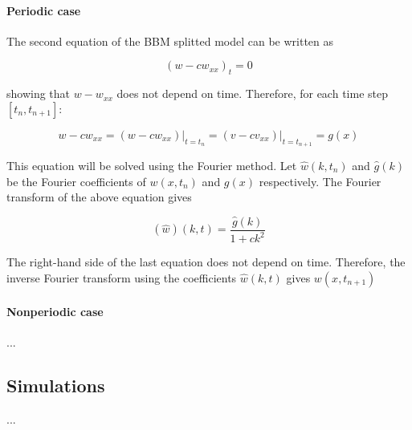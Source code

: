 \paragraph{Periodic case}

\indent The second equation of the BBM splitted model can be written as

$$(w - cw_{xx})_t=0$$

\noindent showing that $w - w_{xx}$ does not depend on time. Therefore, for each time step $[t_n,t_{n+1}] : $

$$w - cw_{xx} = (w - cw_{xx})\rvert_{t=t_n} = (v - cv_{xx})\rvert_{t=t_{n+1}} = g(x)$$

\indent This equation will be solved using the Fourier method. Let $\hat{w}(k,t_n)$ and $\hat{g}(k)$ be the Fourier coefficients of $w(x,t_n)$ and $g(x)$ respectively.  The Fourier transform of the above equation gives

$$(\hat{w})(k,t) = \frac{\hat{g}(k)}{1+ck^2}$$

\indent The right-hand side of the last equation does not depend on time. Therefore, the inverse Fourier transform using the coefficients $\hat{w}(k,t)$ gives $w(x,t_{n+1})$

\paragraph{Nonperiodic case}

...

\subsection{Simulations}

...